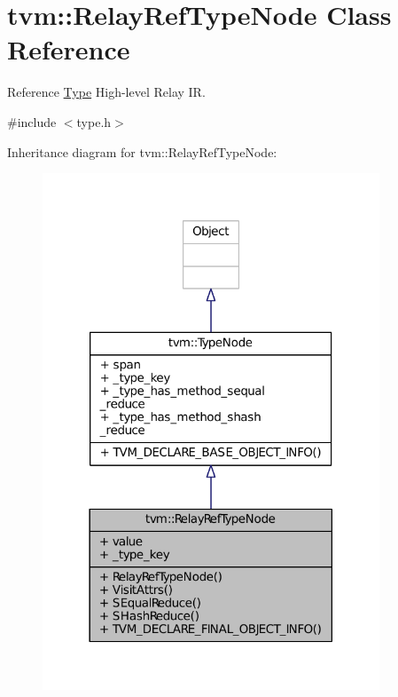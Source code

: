 \hypertarget{classtvm_1_1RelayRefTypeNode}{}\section{tvm\+:\+:Relay\+Ref\+Type\+Node Class Reference}
\label{classtvm_1_1RelayRefTypeNode}


Reference \hyperlink{classtvm_1_1Type}{Type} High-\/level Relay IR.  




{\ttfamily \#include $<$type.\+h$>$}



Inheritance diagram for tvm\+:\+:Relay\+Ref\+Type\+Node\+:
\nopagebreak
\begin{figure}[H]
\begin{center}
\leavevmode
\includegraphics[width=285pt]{classtvm_1_1RelayRefTypeNode__inherit__graph}
\end{center}
\end{figure}


